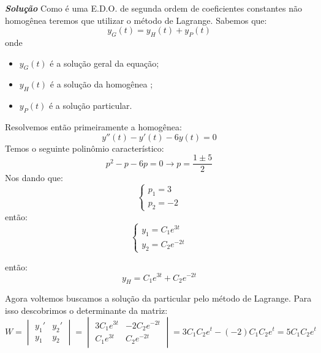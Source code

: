 \linespread{1.5}

\textbf{\textit{Solução}}
Como é uma E.D.O. de segunda ordem de coeficientes constantes não homogênea  teremos que utilizar o método de Lagrange. Sabemos que:
\begin{equation*}
    y_G(t) = y_H(t) + y_P(t)
\end{equation*}
onde 
\begin{itemize}
    \item $y_G(t)$ é a solução geral da equação;
    \item $y_H(t)$ é a solução da homogênea ;
    \item $y_P(t)$ é a solução particular.
\end{itemize}

Resolvemos então primeiramente a homogênea:
\begin{equation*}
    y''(t) - y'(t) - 6y(t) = 0
\end{equation*}
Temos o seguinte polinômio característico:
\begin{equation*}
    p^2 - p - 6p = 0 \rightarrow p = \frac{1 \pm 5}{2}
\end{equation*}
Nos dando que:
\begin{equation*}
    \begin{cases}
        p_1 = 3\\
        p_2 = -2
    \end{cases}
\end{equation*}
então:
\begin{equation*}
    \begin{cases}
        y_1 = C_1e^{3t}\\
        y_2 = C_2e^{-2t}
    \end{cases}
\end{equation*}

então:
\begin{equation*}
    y_H = C_1e^{3t} + C_2e^{-2t}
\end{equation*}

Agora voltemos buscamos a solução da particular pelo método de Lagrange. Para isso descobrimos o determinante da matriz:
\begin{equation*}
    W = \begin{vmatrix} 
        y_1' & y_2'\\
        y_1  & y_2
        \end{vmatrix} = 
        \begin{vmatrix} 
        3C_1e^{3t} & -2C_2e^{-2t}\\
        C_1e^{3t} &  C_2e^{-2t}
        \end{vmatrix} = 3C_1C_2e^t - (-2)C_1C_2e^t = 5C_1C_2e^t
\end{equation*}

